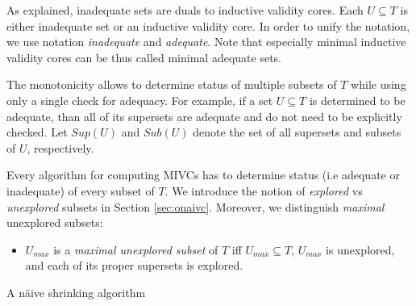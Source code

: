


As explained, inadequate sets are duals to inductive validity cores. Each $U \subseteq T$ is either inadequate set or an inductive validity core. In order to unify the notation, we   use notation \emph{inadequate} and \emph{adequate}. Note that especially minimal inductive validity cores can be thus called  minimal adequate sets.

The monotonicity allows to determine status of multiple subsets of $T$ while using only a single check for adequacy. For example, if a set $U \subseteq T$ is determined to be adequate, than all of its supersets are   adequate and do not need to be explicitly checked. Let     $\mathit{Sup}(U)$ and $\mathit{Sub}(U)$ denote the set of all supersets and subsets of $U$, respectively.

Every algorithm for computing MIVCs has to determine status (i.e adequate or inadequate) of every subset of $T$. We introduce the notion of \emph{explored} vs \emph{unexplored} subsets in Section \ref{sec:onaivc}.
Moreover, we distinguish \emph{maximal} unexplored subsets:

\vspace{-5pt}
\begin{itemize}
	\item $U_{max}$ is a \emph{maximal unexplored subset} of $T$ iff $U_{max} \subseteq T$, $U_{max}$ is unexplored, and each of its proper supersets is explored.
\end{itemize}
\vspace{-5pt}


\begin{algorithm}[!t]
\begin{small}

\caption{A n\"aive shrinking algorithm }
\label{shrink-procedure}
\end{small}
\end{algorithm}


